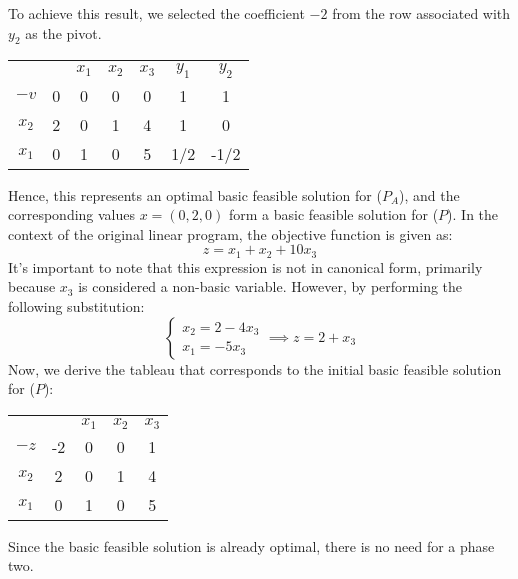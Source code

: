 \begin{example}
    To achieve this result, we selected the coefficient $-2$ from the row associated with $y_2$ as the pivot.
    \begin{table}[H]
        \centering
        \begin{tabular}{ccccccc}
                                   &                        & $x_1$ & $x_2$ & $x_3$                  & $y_1$ & $y_2$                     \\ \cline{2-7} 
        \multicolumn{1}{c|}{$-v$}  & \multicolumn{1}{c|}{0} & 0     & 0     & \multicolumn{1}{c|}{0} & 1     & \multicolumn{1}{c|}{1}    \\ \cline{2-7} 
        \multicolumn{1}{c|}{$x_2$} & \multicolumn{1}{c|}{2} & 0     & 1     & \multicolumn{1}{c|}{4} & 1     & \multicolumn{1}{c|}{0}    \\
        \multicolumn{1}{c|}{$x_1$} & \multicolumn{1}{c|}{0} & 1     & 0     & \multicolumn{1}{c|}{5} & 1/2   & \multicolumn{1}{c|}{-1/2} \\ \cline{2-7} 
        \end{tabular}
    \end{table}
    Hence, this represents an optimal basic feasible solution for ($P_A$), and the corresponding values $x=(0,2,0)$ form a basic feasible solution for ($P$).
    In the context of the original linear program, the objective function is given as:
    \[z=x_1+x_2+10x_3\]
    It's important to note that this expression is not in canonical form, primarily because $x_3$ is considered a non-basic variable. 
    However, by performing the following substitution:
    \[
        \begin{cases}
            x_2=2-4x_3 \\
            x_1=-5x_3
        \end{cases}
        \implies
        z=2+x_3
    \]
    Now, we derive the tableau that corresponds to the initial basic feasible solution for ($P$):
    \begin{table}[H]
        \centering
        \begin{tabular}{ccccc}
                                   &                         & $x_1$ & $x_2$ & $x_3$                  \\ \cline{2-5} 
        \multicolumn{1}{c|}{$-z$}  & \multicolumn{1}{c|}{-2} & 0     & 0     & \multicolumn{1}{c|}{1} \\ \cline{2-5} 
        \multicolumn{1}{c|}{$x_2$} & \multicolumn{1}{c|}{2}  & 0     & 1     & \multicolumn{1}{c|}{4} \\
        \multicolumn{1}{c|}{$x_1$} & \multicolumn{1}{c|}{0}  & 1     & 0     & \multicolumn{1}{c|}{5} \\ \cline{2-5} 
        \end{tabular}
    \end{table}
    Since the basic feasible solution is already optimal, there is no need for a phase two.
\end{example}

